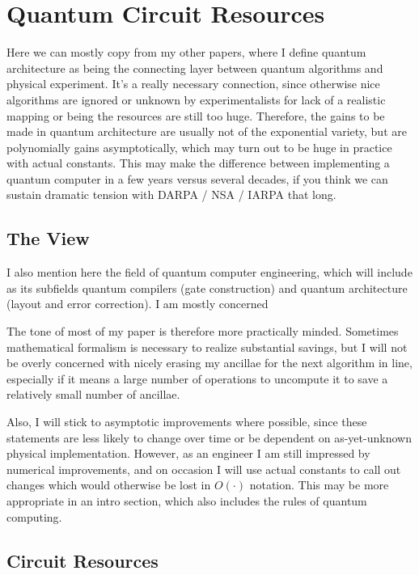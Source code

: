 \section{Quantum Circuit Resources}
\label{sec:circuit}

Here we can mostly copy from my other papers, where I define quantum
architecture as being the connecting layer between quantum algorithms
and physical experiment. It's a really necessary connection, since otherwise
nice algorithms are ignored or unknown by experimentalists for lack of a
realistic mapping or being the resources are still too huge. Therefore, the
gains to be made in quantum architecture are usually not of the exponential
variety, but are polynomially gains asymptotically, which may turn out to be
huge in practice with actual constants. This may make the difference between
implementing a quantum computer in a few years versus several decades, if you
think we can sustain dramatic tension with DARPA / NSA / IARPA that long.

\subsection{The View}

I also mention here the field of quantum computer engineering, which will
include as its subfields quantum compilers (gate construction) and quantum
architecture (layout and error correction). I am mostly concerned

The tone of most of my paper is therefore more practically minded. Sometimes
mathematical formalism is necessary to realize substantial savings, but I will
not be overly concerned with nicely erasing my ancillae for the next algorithm
in line, especially if it means a large number of operations to uncompute it
to save a relatively small number of ancillae.

Also, I will stick to asymptotic improvements where possible, since these
statements are less likely to change over time or be dependent on
as-yet-unknown physical implementation. However, as an engineer I am still
impressed by numerical improvements, and on occasion I will use actual
constants to call out changes which would otherwise be lost in $O(\cdot)$
notation. This may be more appropriate in an intro section, which also
includes the rules of quantum computing.

\subsection{Circuit Resources}


